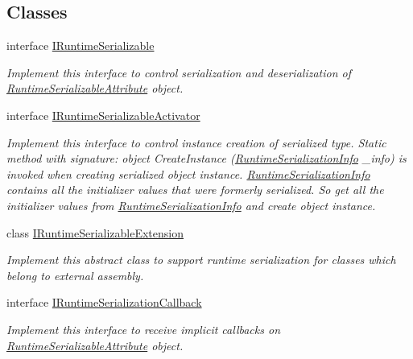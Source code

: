 \subsection*{Classes}
\begin{DoxyCompactItemize}
\item 
interface \hyperlink{interface_voxel_busters_1_1_runtime_serialization_1_1_i_runtime_serializable}{I\+Runtime\+Serializable}
\begin{DoxyCompactList}\small\item\em Implement this interface to control serialization and deserialization of \hyperlink{class_voxel_busters_1_1_runtime_serialization_1_1_runtime_serializable_attribute}{Runtime\+Serializable\+Attribute} object. \end{DoxyCompactList}\item 
interface \hyperlink{interface_voxel_busters_1_1_runtime_serialization_1_1_i_runtime_serializable_activator}{I\+Runtime\+Serializable\+Activator}
\begin{DoxyCompactList}\small\item\em Implement this interface to control instance creation of serialized type. Static method with signature\+: object Create\+Instance (\hyperlink{class_voxel_busters_1_1_runtime_serialization_1_1_runtime_serialization_info}{Runtime\+Serialization\+Info} \+\_\+info) is invoked when creating serialized object instance. \hyperlink{class_voxel_busters_1_1_runtime_serialization_1_1_runtime_serialization_info}{Runtime\+Serialization\+Info} contains all the initializer values that were formerly serialized. So get all the initializer values from \hyperlink{class_voxel_busters_1_1_runtime_serialization_1_1_runtime_serialization_info}{Runtime\+Serialization\+Info} and create object instance. \end{DoxyCompactList}\item 
class \hyperlink{class_voxel_busters_1_1_runtime_serialization_1_1_i_runtime_serializable_extension}{I\+Runtime\+Serializable\+Extension}
\begin{DoxyCompactList}\small\item\em Implement this abstract class to support runtime serialization for classes which belong to external assembly. \end{DoxyCompactList}\item 
interface \hyperlink{interface_voxel_busters_1_1_runtime_serialization_1_1_i_runtime_serialization_callback}{I\+Runtime\+Serialization\+Callback}
\begin{DoxyCompactList}\small\item\em Implement this interface to receive implicit callbacks on \hyperlink{class_voxel_busters_1_1_runtime_serialization_1_1_runtime_serializable_attribute}{Runtime\+Serializable\+Attribute} object. \end{DoxyCompactList}\item 

\end{DoxyCompactItemize}
